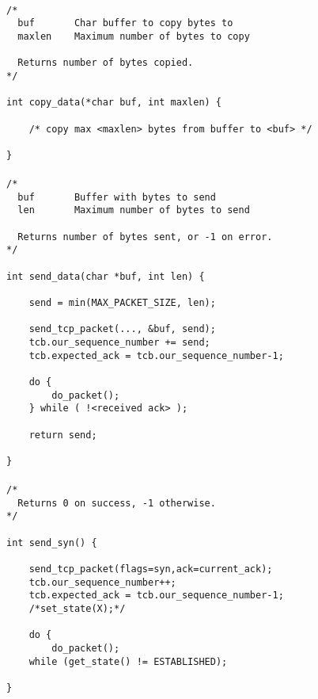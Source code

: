 \documentclass[11pt]{article}
\begin{document}
\paragraph{}


\begin{lstlisting}[title=Procedure copy\_data]
/*
  buf       Char buffer to copy bytes to
  maxlen    Maximum number of bytes to copy

  Returns number of bytes copied.
*/

int copy_data(*char buf, int maxlen) {

    /* copy max <maxlen> bytes from buffer to <buf> */

}
\end{lstlisting}


\paragraph{}


\begin{lstlisting}[title=Procedure send\_data]
/*
  buf       Buffer with bytes to send
  len       Maximum number of bytes to send

  Returns number of bytes sent, or -1 on error.
*/

int send_data(char *buf, int len) {

    send = min(MAX_PACKET_SIZE, len);

    send_tcp_packet(..., &buf, send);
    tcb.our_sequence_number += send;
    tcb.expected_ack = tcb.our_sequence_number-1;

    do {
        do_packet();
    } while ( !<received ack> );

    return send;

}
\end{lstlisting}


\paragraph{}



\begin{lstlisting}[title=Procedure send\_syn]
/*
  Returns 0 on success, -1 otherwise.
*/

int send_syn() {

    send_tcp_packet(flags=syn,ack=current_ack);
    tcb.our_sequence_number++;
    tcb.expected_ack = tcb.our_sequence_number-1;
    /*set_state(X);*/

    do {
        do_packet();
    while (get_state() != ESTABLISHED);

}
\end{lstlisting}
\end{document}
